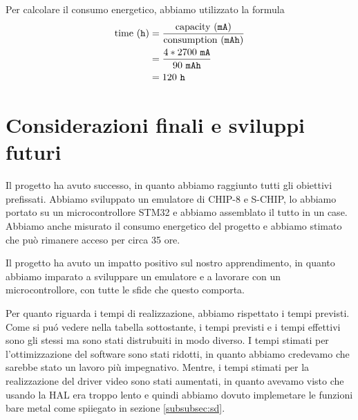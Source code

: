 \documentclass[a4paper]{article}
\begin{document}
Per calcolare il consumo energetico, abbiamo utilizzato la formula
\begin{equation*}
    \begin{aligned}
        \textmd{time} \ (\texttt{h}) & = \frac{\textmd{capacity} \ (\texttt{mA})}{\textmd{consumption} \ (\texttt{mAh})}\\
                                     & = \frac{4 * 2700 \ \texttt{mA}}{90 \ \texttt{mAh}}\\
                                     & = 120 \ \texttt{h}
    \end{aligned}
\end{equation*}

\section{Considerazioni finali e sviluppi futuri}

Il progetto ha avuto successo, in quanto abbiamo raggiunto tutti gli obiettivi prefissati. Abbiamo sviluppato un emulatore di CHIP-8 e S-CHIP, lo abbiamo portato su un microcontrollore STM32 e abbiamo assemblato il tutto in un case. Abbiamo anche misurato il consumo energetico del progetto e abbiamo stimato che può rimanere acceso per circa 35 ore.

Il progetto ha avuto un impatto positivo sul nostro apprendimento, in quanto abbiamo imparato a sviluppare un emulatore e a lavorare con un microcontrollore, con tutte le sfide che questo comporta.

Per quanto riguarda i tempi di realizzazione, abbiamo rispettato i tempi previsti. Come si pu\'o vedere nella tabella sottostante, i tempi previsti e i tempi effettivi sono gli stessi ma sono stati distrubuiti in modo diverso.
I tempi stimati per l'ottimizzazione del software sono stati ridotti, in quanto abbiamo credevamo che sarebbe stato un lavoro più impegnativo. Mentre, i tempi stimati per la realizzazione del driver video sono stati aumentati, in quanto avevamo visto che usando la HAL era troppo lento e quindi abbiamo dovuto implemetare le funzioni bare metal come spiiegato in sezione \ref{subsubsec:sd}.
\end{document}
